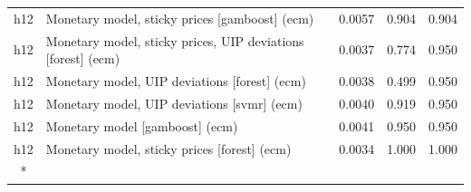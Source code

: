 \begin{ThreePartTable}
\begin{longtable}[t]{cp{5.5cm}ccc}
h12 & \raggedright Monetary model, sticky prices [gamboost] (ecm) & 0.0057 & 0.904 & 0.904\\
h12 & \raggedright Monetary model, sticky prices, UIP deviations [forest] (ecm) & 0.0037 & 0.774 & 0.950\\
h12 & \raggedright Monetary model, UIP deviations [forest] (ecm) & 0.0038 & 0.499 & 0.950\\
h12 & \raggedright Monetary model, UIP deviations [svmr] (ecm) & 0.0040 & 0.919 & 0.950\\
h12 & \raggedright Monetary model [gamboost] (ecm) & 0.0041 & 0.950 & 0.950\\
h12 & \raggedright Monetary model, sticky prices [forest] (ecm) & 0.0034 & 1.000 & 1.000\\*
\end{longtable}
\end{ThreePartTable}
\endgroup{}
